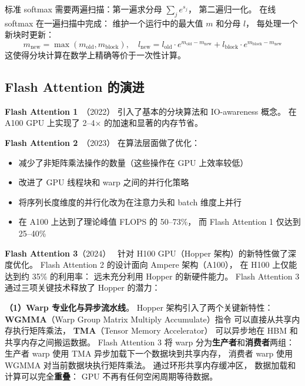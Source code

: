 \begin{corebox}
标准 softmax 需要两遍扫描：第一遍求分母 $\sum_j e^{s_j}$，
第二遍归一化。
在线 softmax 在一遍扫描中完成：
维护一个运行中的最大值 $m$ 和分母 $l$，
每处理一个新块时更新：
\[
  m_{\mathrm{new}} = \max(m_{\mathrm{old}}, m_{\mathrm{block}}), \quad
  l_{\mathrm{new}} = l_{\mathrm{old}} \cdot e^{m_{\mathrm{old}} - m_{\mathrm{new}}}
  + l_{\mathrm{block}} \cdot e^{m_{\mathrm{block}} - m_{\mathrm{new}}}
\]
这使得分块计算在数学上精确等价于一次性计算。
\end{corebox}

\subsection{Flash Attention 的演进}

\textbf{Flash Attention 1}~\cite{dao2022flashattention}（2022）
引入了基本的分块算法和 IO-awareness 概念。
在 A100 GPU 上实现了 2--4$\times$ 的加速和显著的内存节省。

\textbf{Flash Attention 2}~\cite{dao2023flashattention2}（2023）
在算法层面做了优化：
\begin{itemize}[noitemsep]
  \item 减少了非矩阵乘法操作的数量（这些操作在 GPU 上效率较低）
  \item 改进了 GPU 线程块和 warp 之间的并行化策略
  \item 将序列长度维度的并行化改为在注意力头和 batch 维度上并行
  \item 在 A100 上达到了理论峰值 FLOPS 的 50--73\%，
        而 Flash Attention 1 仅达到 25--40\%
\end{itemize}

\textbf{Flash Attention 3}（2024）~\cite{shah2024flashattention3}
针对 H100 GPU（Hopper 架构）的新特性做了深度优化。
Flash Attention 2 的设计面向 Ampere 架构（A100），
在 H100 上仅能达到约 35\% 的利用率：
远未充分利用 Hopper 的新硬件能力。
Flash Attention 3 通过三项关键技术释放了 Hopper 的潜力：

\textbf{（1）Warp 专业化与异步流水线}。
Hopper 架构引入了两个关键新特性：
\textbf{WGMMA}（Warp Group Matrix Multiply Accumulate）指令
可以直接从共享内存执行矩阵乘法，
\textbf{TMA}（Tensor Memory Accelerator）
可以异步地在 HBM 和共享内存之间搬运数据。
Flash Attention 3 将 warp 分为\textbf{生产者}和\textbf{消费者}两组：
生产者 warp 使用 TMA 异步加载下一个数据块到共享内存，
消费者 warp 使用 WGMMA 对当前数据块执行矩阵乘法。
通过环形共享内存缓冲区，
数据加载和计算可以完全\textbf{重叠}：
GPU 不再有任何空闲周期等待数据。

